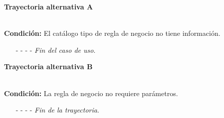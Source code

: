 \hypertarget{CU8-2:TAA}{\textbf{Trayectoria alternativa A}}\\
\noindent \textbf{Condición:} El catálogo tipo de regla de negocio no tiene información.
\begin{enumerate}
	\UCpaso[\UCsist] Muestra el mensaje  en la pantalla  para indicar que no es posible realizar la operación debido a la falta de información necesaria para el sistema.
	\item[- -] - - {\em {Fin del caso de uso}}.%
\end{enumerate}
\hypertarget{CU8-2:TAB}{\textbf{Trayectoria alternativa B}}\\
\noindent \textbf{Condición:} La regla de negocio no requiere parámetros.
\begin{enumerate}
	\UCpaso[\UCactor] Continúa con el paso \ref{CU8.2-P11} de la trayectoria principal.
	\item[- -] - - {\em {Fin de la trayectoria}}.%
\end{enumerate}


